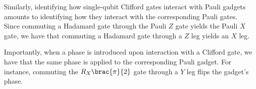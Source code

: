 
Similarly, identifying how single-qubit Clifford gates interact with Pauli gadgets amounts to identifying how they interact with the corresponding Pauli gates. Since commuting a Hadamard gate through the Pauli $Z$ gate yields the Pauli $X$ gate, we have that commuting a Hadamard gate through a $Z$ leg yields an $X$ leg.

Importantly, when a phase is introduced upon interaction with a Clifford gate, we have that the same phase is applied to the corresponding Pauli gadget. For instance, commuting the $R_X \brac{\pi}{2}$ gate through a $Y$ leg flips the gadget's phase.






